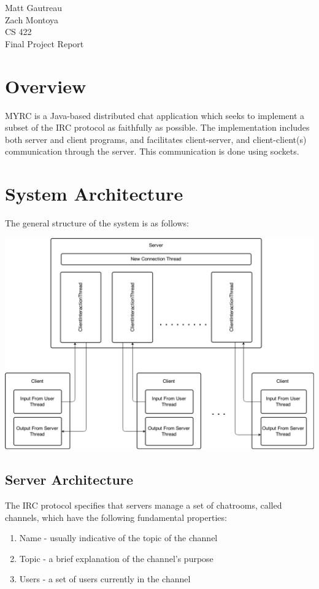 \documentclass{article}
\begin{document}
\begin{flushright}
    Matt Gautreau\\
    Zach Montoya\\
    CS 422\\
    Final Project Report
\end{flushright}

\section{Overview}

MYRC is a Java-based distributed chat application which seeks to implement
a subset of the IRC protocol as faithfully as possible. The implementation
includes both server and client programs, and facilitates client-server, and
client-client(s) communication through the server. This communication is
done using sockets.

\section{System Architecture}

The general structure of the system is as follows:

\begin{center}
\includegraphics[width=\linewidth]{architecture.png}
\end{center}

\subsection{Server Architecture}

The IRC protocol specifies that servers manage a set of chatrooms, called channels,
which have the following fundamental properties:
\begin{enumerate}
    \item
        Name - usually indicative of the topic of the channel
    \item
        Topic - a brief explanation of the channel's purpose
    \item
        Users - a set of users currently in the channel
\end{enumerate}
\end{document}
